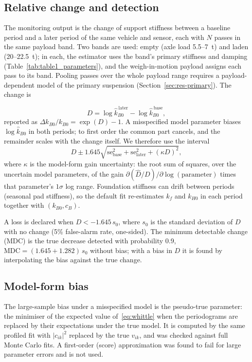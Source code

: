 \subsection{Relative change and detection}\label{sec:relative}
The monitoring output is the change of support stiffness between a baseline period and a later
period of the same vehicle and sensor, each with $N$ passes in the same payload band. Two bands are used:
empty (axle load 5.5--7~t) and laden (20--22.5~t); in each, the estimator uses the band's primary
stiffness and damping (Table~\ref{tab:table1_parameters}), and the weigh-in-motion payload assigns each
pass to its band. Pooling passes over the whole payload range requires a payload-dependent model of the
primary suspension (Section~\ref{sec:res-primary}). The change is

\begin{equation}
  D = \log\hat k_{B0}^{\,\mathrm{later}} - \log\hat k_{B0}^{\,\mathrm{base}},
\end{equation}
reported as $\Delta k_{B0}/k_{B0} = \exp(D)-1$. A misspecified model parameter biases $\log\hat k_{B0}$
in both periods; to first order the common part cancels, and the remainder scales with the change
itself. We therefore use the interval
\begin{equation}
  D \pm 1.645\sqrt{\mathrm{se}_\mathrm{base}^2 + \mathrm{se}_\mathrm{later}^2 + (\kappa D)^2},
  \label{eq:interval}
\end{equation}
where $\kappa$ is the model-form gain uncertainty: the root sum of squares, over the uncertain model
parameters, of the gain $\partial(\hat D/D)/\partial\log(\text{parameter})$ times that parameter's
$1\sigma$ log range. Foundation stiffness can drift between periods (seasonal pad stiffness), so the
default fit re-estimates $k_f$ and $k_{H0}$ in each period together with $(k_{B0}, c_B)$.

A loss is declared when $D < -1.645\,s_0$, where $s_0$ is the standard deviation of $D$ with no
change (5\% false-alarm rate, one-sided). The minimum detectable change (MDC) is the true decrease
detected with probability 0.9, $\mathrm{MDC} = (1.645 + 1.282)\,s_0$ without bias; with a bias in
$D$ it is found by interpolating the bias against the true change.

\subsection{Model-form bias}\label{sec:pseudotrue}
The large-sample bias under a misspecified model is the pseudo-true parameter: the minimiser of the
expected value of~\eqref{eq:whittle} when the periodograms are replaced by their expectations under
the true model. It is computed by the same profiled fit with $|c_{ik}|^2$ replaced by the true
$v_{ik}$, and was checked against full Monte Carlo fits. A first-order (score) approximation was
found to fail for large parameter errors and is not used.

